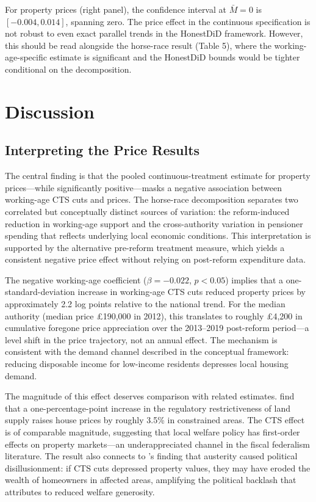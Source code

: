 \documentclass[12pt]{article}
\begin{document}
For property prices (right panel), the confidence interval at $\bar{M} = 0$ is $[-0.004, 0.014]$, spanning zero. The price effect in the continuous specification is not robust to even exact parallel trends in the HonestDiD framework. However, this should be read alongside the horse-race result (Table 5), where the working-age-specific estimate is significant and the HonestDiD bounds would be tighter conditional on the decomposition.

\section{Discussion}\label{sec:discussion}

\subsection{Interpreting the Price Results}

The central finding is that the pooled continuous-treatment estimate for property prices---while significantly positive---masks a negative association between working-age CTS cuts and prices. The horse-race decomposition separates two correlated but conceptually distinct sources of variation: the reform-induced reduction in working-age support and the cross-authority variation in pensioner spending that reflects underlying local economic conditions. This interpretation is supported by the alternative pre-reform treatment measure, which yields a consistent negative price effect without relying on post-reform expenditure data.

The negative working-age coefficient ($\beta = -0.022$, $p < 0.05$) implies that a one-standard-deviation increase in working-age CTS cuts reduced property prices by approximately 2.2 log points relative to the national trend. For the median authority (median price \pounds190,000 in 2012), this translates to roughly \pounds4,200 in cumulative foregone price appreciation over the 2013--2019 post-reform period---a level shift in the price trajectory, not an annual effect. The mechanism is consistent with the demand channel described in the conceptual framework: reducing disposable income for low-income residents depresses local housing demand.

The magnitude of this effect deserves comparison with related estimates. \citet{hilber2016} find that a one-percentage-point increase in the regulatory restrictiveness of land supply raises house prices by roughly 3.5\% in constrained areas. The CTS effect is of comparable magnitude, suggesting that local welfare policy has first-order effects on property markets---an underappreciated channel in the fiscal federalism literature. The result also connects to \citet{fetzer2019}'s finding that austerity caused political disillusionment: if CTS cuts depressed property values, they may have eroded the wealth of homeowners in affected areas, amplifying the political backlash that \citet{fetzer2019} attributes to reduced welfare generosity.
\end{document}

